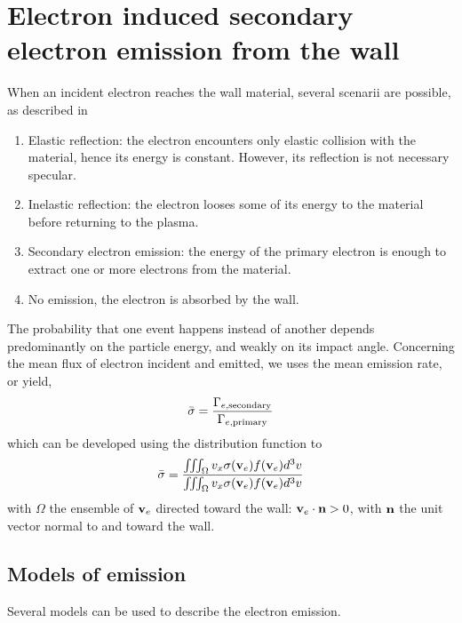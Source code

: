 
\section{Electron induced secondary electron emission from the wall}
\label{sec-seemodel}
When an incident electron reaches the wall material, several scenarii are possible, as described in \citet{villemant2018}
\begin{enumerate}
  \item Elastic reflection\string: the electron encounters only elastic collision with the material, hence its energy is constant. However, its reflection is not necessary specular.
  \item Inelastic reflection\string: the electron looses some of its energy to the material before returning to the plasma.
  \item Secondary electron emission\string: the energy of the primary electron is enough to extract one or more electrons from the material.
  \item No emission, the electron is absorbed by the wall.
\end{enumerate}

The probability \proba{}  that one event happens instead of another depends predominantly on the particle energy, and weakly on its  impact angle.
Concerning the mean flux of electron incident and emitted, we uses the mean emission rate, or yield, \rate
\begin{equation*} \label{eq-ratedifinition}
   \bar{\sigma } = \frac{\Gamma_{e, \rm secondary}}{\Gamma_{e, \rm primary}}
\end{equation*}
which can be developed using the distribution function to 
\begin{equation*} \label{eq-ratedifinition_evdf}
   \bar{\sigma } = \frac{\iiint_{\Omega} v_x \sigma ({\mathbf v_e}) f({\mathbf v_e}) d^3v}{\iiint_{\Omega} v_x \sigma ({\mathbf v_e}) f({\mathbf v_e}) d^3v}
\end{equation*}
with $\Omega$ the ensemble of ${\mathbf v_e}$ directed toward the wall\string: ${\mathbf v_e} \cdot {\mathbf n} > 0$, with ${\mathbf n} $ the unit vector normal to and toward the wall.

\subsection{Models of emission } \label{subsec-seemodels}
Several models can be used to describe the electron emission.

